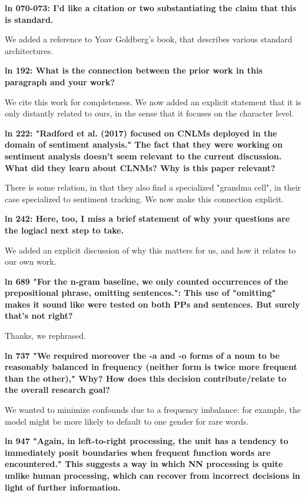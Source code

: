 \documentclass{article}[11pt,a4paper,oneside]
\begin{document}
\textbf{
ln 070-073: I'd like a citation or two substantiating the claim that this is
standard.}

We added a reference to Yoav Goldberg's book, that describes various standard architectures.\newline

\textbf{
ln 192: What is the connection between the prior work in this paragraph and
your work?}

 We cite this work for completeness. We now added an explicit statement that it is only distantly related to ours, in the sense that it focuses on the character level.\newline

\textbf{
ln 222: "Radford et al. (2017) focused on CNLMs deployed in the domain of
sentiment analysis." The fact that they were working on sentiment analysis
doesn't seem relevant to the current discussion. What did they learn about
CLNMs? Why is this paper relevant?}

There is some relation, in that they also find a specialized "grandma cell", in their case specialized to sentiment tracking. We now make this connection explicit.\newline

\textbf{
ln 242: Here, too, I miss a brief statement of why your questions are the
logiacl next step to take.}

We added an explicit discussion of why this matters for us, and how it relates to our own work.\newline

\textbf{
ln 689 "For the n-gram baseline, we only counted occurrences of the
prepositional phrase, omitting sentences.": This use of "omitting" makes it
sound like were tested on both PPs and sentences. But surely that's not
right?}

Thanks, we rephrased.\newline

\textbf{
ln 737 "We required moreover the -a and -o forms of a noun to be reasonably
balanced in frequency (neither form is twice more frequent than the other),"
Why? How does this decision contribute/relate to the overall research goal?}

We wanted to minimize confounds due to a frequency imbalance: for example, the model might be more likely to default to one gender for rare words.\newline

\textbf{
ln 947 "Again, in left-to-right processing, the unit has a tendency to
immediately posit boundaries when frequent function words are encountered."
This suggests a way in which NN processing is quite unlike human processing,
which can recover from incorrect decisions in light of further information.}
\end{document}
